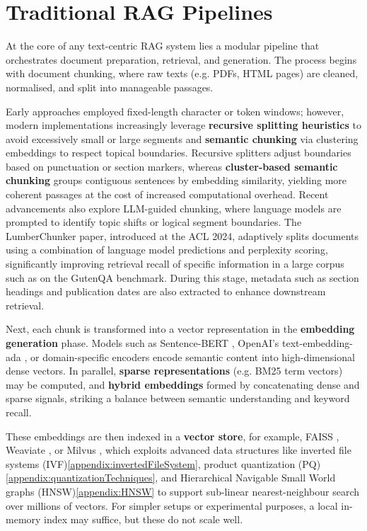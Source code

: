 \documentclass[12pt,twoside]{report}
\begin{document}
\section{Traditional RAG Pipelines} \label{section:traditionalRAGPipelines}

At the core of any text-centric RAG system lies a modular pipeline that orchestrates document preparation, retrieval, and generation. The process begins with document chunking, where raw texts (e.g. PDFs, HTML pages) are cleaned, normalised, and split into manageable passages.

Early approaches employed fixed-length character or token windows; however, modern implementations increasingly leverage \textbf{recursive splitting heuristics}\cite{RecurrentChunking}\cite{SplittingHeuristics} to avoid excessively small or large segments and \textbf{semantic chunking} via clustering embeddings to respect topical boundaries. Recursive splitters adjust boundaries based on punctuation or section markers, whereas \textbf{cluster-based semantic chunking} groups contiguous sentences by embedding similarity, yielding more coherent passages at the cost of increased computational overhead.
Recent advancements also explore LLM-guided chunking, where language models are prompted to identify topic shifts or logical segment boundaries. The LumberChunker\cite{LumberChunker} paper, introduced at the ACL 2024, adaptively splits documents using a combination of language model predictions and perplexity scoring, significantly improving retrieval recall of specific information in a large corpus such as on the GutenQA benchmark. During this stage, metadata such as section headings and publication dates are also extracted to enhance downstream retrieval.

Next, each chunk is transformed into a vector representation in the \textbf{embedding generation} phase. Models such as Sentence-BERT \cite{SentenceBERT}, OpenAI's text-embedding-ada \cite{OpenAITextEmbedding}, or domain-specific encoders encode semantic content into high-dimensional dense vectors. In parallel, \textbf{sparse representations} (e.g. BM25\cite{BM25} term vectors) may be computed, and \textbf{hybrid embeddings} formed by concatenating dense and sparse signals, striking a balance between semantic understanding and keyword recall.

These embeddings are then indexed in a \textbf{vector store}, for example, FAISS \cite{FAISS}, Weaviate \cite{Weaviate}, or Milvus \cite{Milvus}, which exploits advanced data structures like inverted file systems (IVF)\ref{appendix:invertedFileSystem}, product quantization (PQ)\ref{appendix:quantizationTechniques}, and Hierarchical Navigable Small World graphs (HNSW)\ref{appendix:HNSW} to support sub-linear nearest-neighbour search over millions of vectors. For simpler setups or experimental purposes, a local in-memory index may suffice, but these do not scale well.
\end{document}
